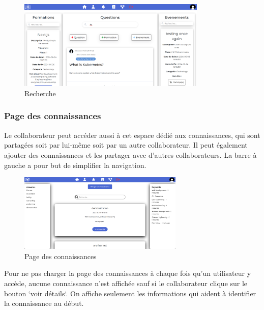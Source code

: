 \documentclass{article}
\begin{document}
                \begin{figure}[h!]
                    \centering
                    \includegraphics[width=0.8\textwidth]{assets/webSite/search.png}
                    \caption{Recherche}
                \end{figure}
                \FloatBarrier 
            \subsubsection{Page des connaissances}
                Le collaborateur peut accéder aussi à cet espace dédié aux connaissances, qui sont partagées soit par lui-même soit par un autre collaborateur. Il peut également ajouter des connaissances et les partager avec d'autres collaborateurs. La barre à gauche a pour but de simplifier la navigation.
                \begin{figure}[h!]
                    \centering
                    \includegraphics[width=0.7\textwidth]{assets/webSite/base-de-connaissance.png}
                    \caption{Page des connaissances}
                \end{figure}
                \FloatBarrier
                Pour ne pas charger la page des connaissances à chaque fois qu'un utilisateur y accède, aucune connaissance n'est affichée sauf si le collaborateur clique sur le bouton `voir détails`. On affiche seulement les informations qui aident à identifier la connaissance au début.
\end{document}
